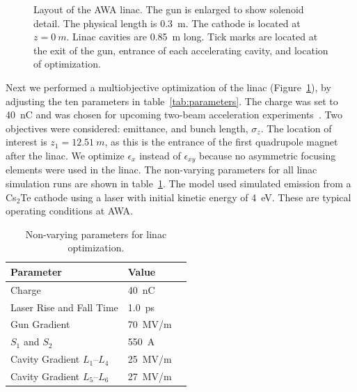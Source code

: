 \documentclass{iitthesis}
\begin{document}
\begin{figure}
\begin{center}
	\end{center}
	\caption{Layout of the AWA linac.
		The gun is enlarged to show solenoid detail. The physical length is
		\SI{0.3}{m}. The cathode is located at $z=\SI{0}{m}$. Linac cavities are
		\SI{0.85}{m} long. Tick marks are located at the exit of the gun, entrance of
		each accelerating cavity, and location of optimization.}
	\label{fig:beamline} 
\end{figure} 

Next we performed a multiobjective optimization of the linac (Figure~\ref{fig:beamline}), 
by adjusting the ten parameters in table~\ref{tab:parameters}. The charge was set to \SI{40}{nC}
and was chosen for upcoming two-beam acceleration experiments~\cite{tba2017}. 
Two objectives were considered: emittance, and bunch length, $\sigma_z$. 
The location of interest is $z_1=\SI{12.51}{m}$, as this is the entrance of the first 
quadrupole magnet after the linac. We optimize $\epsilon_x$ instead of $\epsilon_{xy}$ because 
no asymmetric focusing elements were used in the linac. 
The non-varying parameters for all linac simulation runs are shown in table~\ref{tab:linac}.
The model used simulated emission
from a Cs$_2$Te cathode using a laser with initial kinetic energy of \SI{4}{eV}. 
These are typical operating conditions at AWA. 
\begin{table}[h] %
	\caption{\label{tab:linac} Non-varying parameters for linac optimization.}
	\begin{center}
		\begin{tabular}{lll}
			\toprule
			\textbf{Parameter} & \textbf{Value} \\
			\midrule
			Charge  & \SI{40}{nC} \\
			Laser Rise and Fall Time & \SI{1.0}{ps} \\
			Gun Gradient & \SI{70}{MV/m} \\
			$S_1$ and $S_2$ & \SI{550}{A}\\
			Cavity Gradient $L_1$--$L_4$ & \SI{25}{MV/m} \\
			Cavity Gradient $L_5$--$L_6$ & \SI{27}{MV/m} \\
			\bottomrule
		\end{tabular}
	\end{center}
\end{table}
\end{document}
